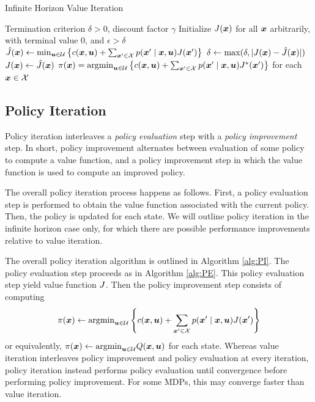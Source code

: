 \begin{algorithm}[t]
\caption{Infinite Horizon Value Iteration}
\centering
\label{alg:VI}

\begin{algorithmic}[1]
    \Require Termination criterion $\delta>0$, discount factor $\gamma$
    \State Initialize $J(\bm{x})$ for all $\bm{x}$ arbitrarily, with terminal value $0$, and $\epsilon>\delta$
    \While{$\epsilon > \delta$}
            \State $\hat{J}(\bm{x}) \gets \min_{\bm{u} \in \mathcal{U}} \left\{c(\bm{x}, \bm{u}) + \sum_{\bm{x}' \in \mathcal{X}} p(\bm{x}' \mid \bm{x}, \bm{u}) J(\bm{x}')\right\}$
            \State $\delta \gets \max(\delta, |J(\bm{x}) - \hat{J}(\bm{x})|)$
            \State $J(\bm{x}) \gets \hat{J}(\bm{x})$
        \EndFor
    \EndWhile
    \State \Return $\pi(\bm{x}) = \text{argmin}_{\bm{u}\in\mathcal{U}} \left\{c(\bm{x}, \bm{u}) + \sum_{\bm{x}' \in \mathcal{X}} p(\bm{x}' \mid \bm{x}, \bm{u}) J^*(\bm{x}')\right\}$ for each $\bm{x} \in \mathcal{X}$
\end{algorithmic}
\end{algorithm}


\subsection{Policy Iteration}

Policy iteration interleaves a \textit{policy evaluation} step with a \textit{policy improvement} step. In short, policy improvement alternates between evaluation of some policy to compute a value function, and a policy improvement step in which the value function is used to compute an improved policy. 

The overall policy iteration process happens as follows. First, a policy evaluation step is performed to obtain the value function associated with the current policy. Then, the policy is updated for each state. We will outline policy iteration in the infinite horizon case only, for which there are possible performance improvements relative to value iteration. 

The overall policy iteration algorithm is outlined in Algorithm \ref{alg:PI}. The policy evaluation step proceeds as in Algorithm \ref{alg:PE}. This policy evaluation step yield value function $J$. Then the policy improvement step consists of computing 
\begin{equation}
    \pi(\bm{x}) \gets \text{argmin}_{\bm{u}\in\mathcal{U}} \left\{ c(\bm{x}, \bm{u}) + \sum_{\bm{x}' \in \mathcal{X}} p(\bm{x}' \mid \bm{x}, \bm{u}) J(\bm{x}') \right\}
\end{equation}
or equivalently, $\pi(\bm{x}) \gets \text{argmin}_{\bm{u}\in\mathcal{U}} Q(\bm{x},\bm{u})$ for each state. Whereas value iteration interleaves policy improvement and policy evaluation at every iteration, policy iteration instead performs policy evaluation until convergence before performing policy improvement. For some MDPs, this may converge faster than value iteration. 

